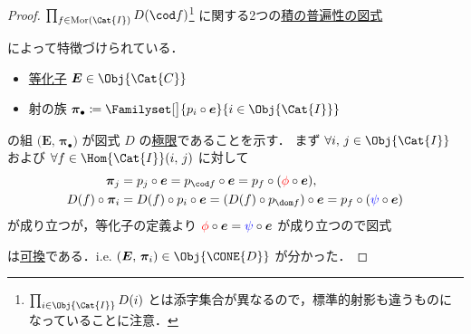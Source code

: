 \documentclass[geometry_main]{subfiles}
\begin{document}
\begin{proof}
	$\prod_{f \in \mathrm{Mor}(\Cat{I})} D(\cod f)$\footnote{$\prod_{i \in \Obj{\Cat{I}}} D(i)$ とは添字集合が異なるので，標準的射影も違うものになっていることに注意．}
	に関する2つの\hyperref[cmtd:univ-product]{積の普遍性の図式}
	\begin{figure}[H]
		\centering
		\begin{subfigure}{0.4\columnwidth}
			\centering
		\end{subfigure}
		\hspace{5mm}
		\begin{subfigure}{0.4\columnwidth}
			\centering
		\end{subfigure}
	\end{figure}%
	によって特徴づけられている．

	\begin{itemize}
		\item \hyperref[def:equalizer]{等化子} $\bm{E} \in \Obj{\Cat{C}}$
		\item 射の族 $\bm{\pi}_\bullet \coloneqq \Familyset[\big]{p_i \circ \bm{e}}{i \in \Obj{\Cat{I}}}$
	\end{itemize}
	の組 $\bigl(\bm{E},\, \bm{\pi}_\bullet\bigr)$ が図式 $D$ の\hyperref[def:limit]{極限}であることを示す．
	まず $\forall i,\, j \in \Obj{\Cat{I}}$ および $\forall f \in \Hom{\Cat{I}}(i,\, j)$ に対して
	\begin{align}
		\bm{\pi}_j &= p_j \circ \bm{e} = p_{\cod f} \circ \bm{e} = p_f \circ (\textcolor{red}{\phi} \circ \bm{e}), \\
		D(f) \circ \bm{\pi}_i &= D(f) \circ p_i \circ \bm{e} = (D(f) \circ p_{\dom f}) \circ \bm{e} = p_f \circ (\textcolor{blue}{\psi} \circ \bm{e})
	\end{align}
	が成り立つが，等化子の定義より $\textcolor{red}{\phi} \circ \bm{e} = \textcolor{blue}{\psi} \circ \bm{e}$ が成り立つので図式
	\begin{center}
	\end{center}
	は\hyperref[def:commutative]{可換}である．i.e. $(\bm{E},\, \bm{\pi}_i) \in \Obj{\CONE{D}}$ が分かった．
	

\end{proof}
\end{document}
